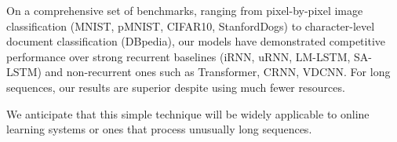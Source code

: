 \documentclass{article}
\begin{document}
On a comprehensive set of benchmarks, ranging from pixel-by-pixel image classification (MNIST, pMNIST, CIFAR10, StanfordDogs) to character-level document classification (DBpedia), our models have demonstrated competitive performance over strong recurrent baselines (iRNN, uRNN, LM-LSTM, SA-LSTM) and non-recurrent ones such as Transformer, CRNN, VDCNN. For long sequences, our results are superior despite using much fewer resources.

We anticipate that this simple technique will be widely applicable to online learning systems or ones that process unusually long sequences.




\end{document}
